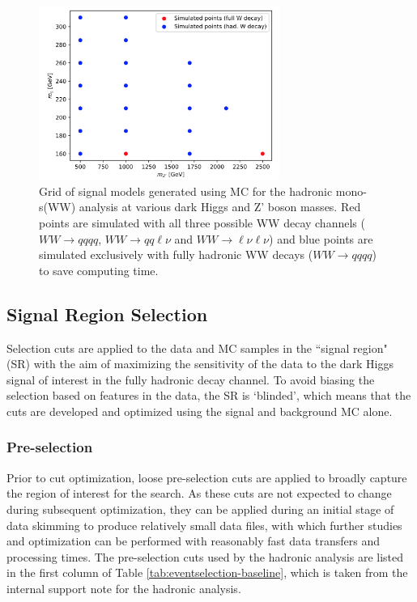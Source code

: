 \documentclass[12pt]{article}
\begin{document}
 \begin{figure}[H]
	\centering
	\includegraphics[width=0.7\textwidth]{figures/had_grid.png}
	\caption[]{Grid of signal models generated using MC for the hadronic mono-s(WW) analysis at various dark Higgs and Z' boson masses. Red points are simulated with all three possible WW decay channels ($WW \rightarrow qqqq$, $WW \rightarrow qq\ell\nu$ and $WW \rightarrow \ell\nu\ell\nu$) and blue points are simulated exclusively with fully hadronic WW decays ($WW \rightarrow qqqq$) to save computing time.}
	\label{fig:had_grid} 
\end{figure}

\subsection{Signal Region Selection}

Selection cuts are applied to the data and MC samples in the ``signal region" (SR) with the aim of maximizing the sensitivity of the data to the dark Higgs signal of interest in the fully hadronic decay channel. To avoid biasing the selection based on features in the data, the SR is `blinded', which means that the cuts are developed and optimized using the signal and background MC alone.

\subsubsection{Pre-selection}

Prior to cut optimization, loose pre-selection cuts are applied to broadly capture the region of interest for the search. As these cuts are not expected to change during subsequent optimization, they can be applied during an initial stage of data skimming to produce relatively small data files, with which further studies and optimization can be performed with reasonably fast data transfers and processing times. The pre-selection cuts used by the hadronic analysis are listed in the first column of Table \ref{tab:eventselection-baseline}, which is taken from the internal support note for the hadronic analysis. 
\end{document}
